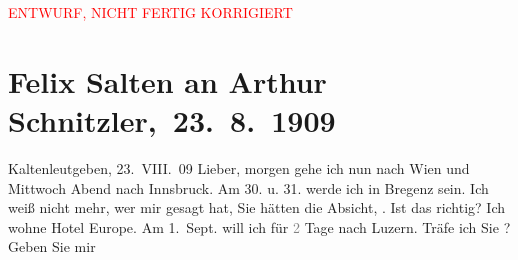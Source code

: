 
\begin{center}
            \textcolor{red}{ENTWURF, NICHT FERTIG KORRIGIERT}
                      \end{center}
            
         
         \renewcommand{\erwaehntePersonen}{Personen: Lili Cappellini, Anna Katharina Rehmann, Felix Salten, Ottilie Salten, Paul Salten, Heinrich Schnitzler, Olga Schnitzler}
         \renewcommand{\erwaehnteOrte}{Orte: Bregenz, Gütsch, Hotel de l’Europe, Innsbruck, Kaltenleutgeben, Salzburg, Wien}
         \renewcommand{\erwaehnteWerke}{}
               \section[ Felix Salten an Arthur Schnitzler, 23. 8. 1909]{ Felix Salten an Arthur Schnitzler, 23. 8. 1909}\nopagebreak{}\rehead{ }\begin{ledgroupsized}[t]{13cm}\normalsize\beginnumbering \toendnotes[C]{\smallbreak\pagebreak[2]} 
\toendnotes[C]{\smallbreak}\pstart
           \raggedleft{}{\pb}Kaltenleutgeben, 23. VIII. 09\pend
           \pstart
           Lieber,{ }morgen gehe ich nun nach Wien und Mittwoch{ }Abend nach Innsbruck. Am 30. u. 31. werde ich in
                  Bregenz sein. Ich weiß nicht mehr, wer mir
               gesagt hat, Sie hätten die Absicht, \label{K_L03506-1v}\label{K_L03506-1h}. Ist das richtig? Ich wohne Hotel Europe. Am 1. Sept. will ich für \textcolor{gray}{2} Tage nach Luzern. Träfe ich Sie \label{K_L03506-2v}\label{K_L03506-2h}? Geben Sie mir

\end{ledgroupsized}
